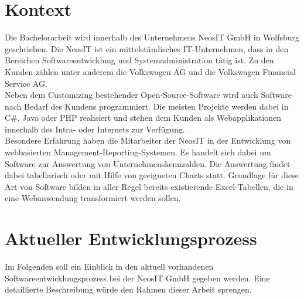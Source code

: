 \documentclass[a4paper,12pt]{scrreprt}
\begin{document}
\section{Kontext}
Die Bachelorarbeit wird innerhalb des Unternehmens NeosIT GmbH in Wolfsburg ge\-schrieben. Die NeosIT ist ein mittelständisches IT-Unternehmen, dass in den Bereichen Softwareentwicklung und Systemadministration tätig ist. Zu den Kunden zählen unter anderem die Volkswagen AG und die Volkswagen Financial Service AG.\\
Neben dem Customizing bestehender Open-Source-Software wird auch Software nach Bedarf des Kundens programmiert.
Die meisten Projekte werden dabei in C\#, Java oder PHP realisiert und stehen dem Kunden als Webapplikationen innerhalb des Intra- oder Internets zur Verfügung.\\
Besondere Erfahrung haben die Mitarbeiter der NeosIT in der Entwicklung von webbasierten Management-Reporting-Systemen. Es handelt sich dabei um Software zur Auswertung von Unternehmenskennzahlen. Die Auswertung findet dabei tabellarisch oder mit Hilfe von geeigneten Charts statt. Grundlage für diese Art von Software bilden in aller Regel bereits existierende Excel-Tabellen, die in eine Webanwendung transformiert werden sollen.
\section{Aktueller Entwicklungsprozess}
Im Folgenden soll ein Einblick in den aktuell vorhandenen Softwareent\-wick\-lungs\-prozess bei der NeosIT GmbH gegeben werden. Eine detaillierte Beschreibung würde den Rahmen dieser Arbeit sprengen.
\end{document}
